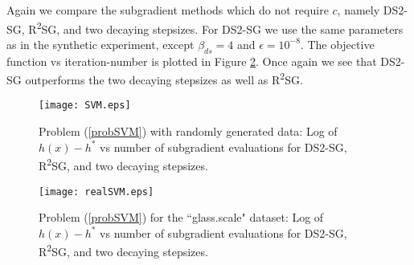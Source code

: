 Again we compare the subgradient methods which do not require $c$, namely DS2-SG, R\textsuperscript{2}SG, and two decaying stepsizes. For DS2-SG we use the same parameters as in the synthetic experiment, except $\beta_{ds}=4$ and $\epsilon=10^{-8}$. The  objective function vs iteration-number is plotted in Figure \ref{fig_realSVM}. Once again we see that DS2-SG outperforms the two decaying stepsizes as well as R\textsuperscript{2}SG. 


\begin{figure}[h!]
\centering
\texttt{[image: SVM.eps]}
\caption{Problem (\ref{probSVM}) with randomly generated data: Log of $h(x)-h^*$  vs number of subgradient evaluations for DS2-SG,   R\textsuperscript{2}SG, and two decaying stepsizes.}
\label{figSVM}
\end{figure}

\begin{figure}[h!]
\centering
\texttt{[image: realSVM.eps]}
\caption{Problem (\ref{probSVM}) for the ``glass.scale" dataset: Log of $h(x)-h^*$  vs number of subgradient evaluations for DS2-SG,   R\textsuperscript{2}SG, and two decaying stepsizes.}
\label{fig_realSVM}
\end{figure}

